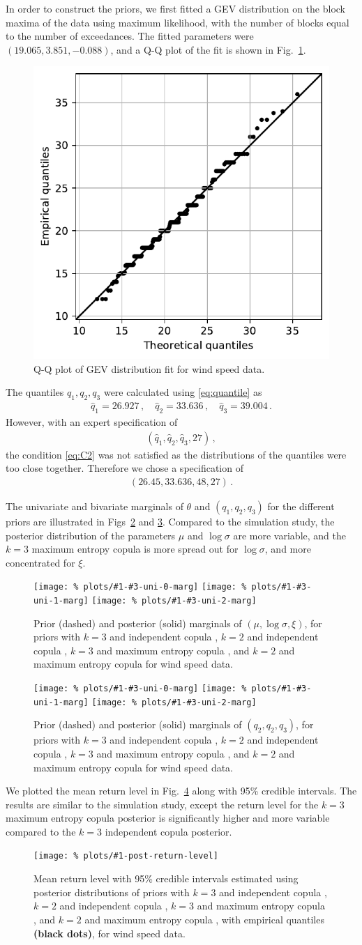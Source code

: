 \documentclass{article}
\newcommand{\marginals}[6]{
	\begin{figure}
		\centering
		\texttt{[image: \%
						plots/\#1-\#3-uni-0-marg]}
		\texttt{[image: \%
						plots/\#1-\#3-uni-1-marg]}
		\texttt{[image: \%
						plots/\#1-\#3-uni-2-marg]}
		\caption{Prior (dashed) and posterior (solid) marginals of
			$(#4, #5, #6)$, for priors with
			$k = 3$ and independent copula \textbf{\color{blue}{(blue)}},
			$k = 2$ and independent copula \textbf{\color{green}{(green)}},
			$k = 3$ and maximum entropy copula
			\textbf{\color{orange}{(orange)}}, and
			$k = 2$ and maximum entropy copula \textbf{\color{red}{(red)}}
			for #2.}
		\label{table:#1-#3-uni-marg}
	\end{figure}
}
\newcommand{\allmarginals}[2]{
	\marginals{#1}{#2}{theta}{\mu}{\log\sigma}{\xi}
	\marginals{#1}{#2}{q}{q_2}{q_2}{q_3}
}
\newcommand{\allreturnlevels}[3]{
	\begin{figure}
		\centering
		\texttt{[image: \%
			plots/\#1-post-return-level]}
		\caption{Mean return level with 95\% credible intervals
			estimated using posterior distributions of priors with
			$k = 3$ and independent copula \textbf{\color{blue}{(blue)}},
			$k = 2$ and independent copula \textbf{\color{green}{(green)}},
			$k = 3$ and maximum entropy copula
			\textbf{\color{orange}{(orange)}}, and
			$k = 2$ and maximum entropy copula \textbf{\color{red}{(red)}},
			with empirical quantiles {\color{black} \textbf{(black dots)}},
			#3for #2.}
		\label{table:#1-post-return-level}
	\end{figure}
}
\begin{document}
%
In order to construct the priors,
we first fitted a GEV distribution on the block maxima of the data
using maximum likelihood,
with the number of blocks equal to the number of exceedances.
The fitted parameters were
$(19.065, 3.851, -0.088)$, and
a Q-Q plot of the fit is shown in Fig.~\ref{fig:ws-qq}.
%
\begin{figure}
	\centering
	\includegraphics[width=0.55\linewidth]{plots/ws-qq.pdf}
	\caption{Q-Q plot of GEV distribution fit for wind speed data.}
	\label{fig:ws-qq}
\end{figure}
%
The quantiles $q_1, q_2, q_3$ were calculated
using \eqref{eq:quantile} as
%
\begin{align*}
	\hat{q}_1 = 26.927 \,,
	\quad \hat{q}_2 = 33.636 \,,
	\quad \hat{q}_3 = 39.004 \,.
\end{align*}
%
However, with an expert specification of
%
\begin{align*}
	\left(\hat{q}_1, \hat{q}_2, \hat{q}_3, 27 \right) \,,
\end{align*}
%
the condition \eqref{eq:C2} was not satisfied as the distributions
of the quantiles
were too close together. Therefore we chose a specification of
%
\begin{align*}
	\left(26.45, 33.636, 48, 27 \right) \,.
\end{align*}
%

%
The univariate and bivariate marginals of
$\theta$ and $(q_1, q_2, q_3)$ for the different priors are illustrated
in Figs~\ref{table:ws-theta-uni-marg} and \ref{table:ws-q-uni-marg}.
Compared to the simulation study, the posterior distribution of the
parameters $\mu$ and $\log\sigma$ are more variable,
and the
$k = 3$ maximum entropy copula is more spread out for $\log\sigma$,
and more concentrated for $\xi$.
%
\allmarginals{ws}{wind speed data}
%

%
We plotted the mean return level in Fig.~\ref{table:ws-post-return-level}
along with 95\% credible intervals. The results are similar
to the simulation study, except the return level for the
$k = 3$ maximum entropy copula posterior
is significantly higher and more variable compared
to the $k = 3$ independent copula posterior.
%
\allreturnlevels{ws}{wind speed data}{}
%
\FloatBarrier
%
\end{document}

